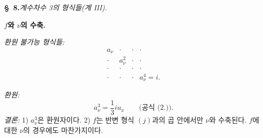
\begin{center}
\textbf{\S\ 8.}\quad\emph{계수차수 3의 형식들(계 III).}
\end{center}

\noindent\textbf{$f$와 $\nu$의 수축.}

\noindent\emph{환원 불가능 형식들:}
\[
\begin{array}{cccc}
a_\nu&\cdot&\cdot&\cdot\\
\cdot&a_\nu^2&\cdot&\cdot\\
\cdot&\cdot&\cdot&\cdot\\
\cdot&\cdot&\cdot&a_\nu^4=i.
\end{array}
\]

\noindent\emph{환원:}
\[
a_\nu^3=\frac13iu_x\qquad\text{(공식 (2.)).}
\]
\noindent\emph{결론:} 1) $a_\nu^3$은 환원자이다. 2) $f$는 반변 형식 $(j)$과의 곱 안에서만 $\nu$와 수축된다. $f$에 대한 $\nu$의 경우에도 마찬가지이다.
